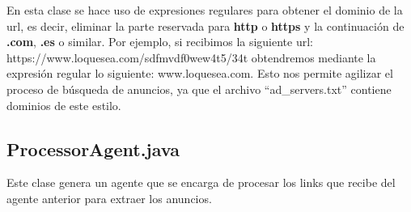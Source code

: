 \documentclass{pre-tfg}
\begin{document}
En esta clase se hace uso de expresiones regulares para obtener el dominio de la url, es decir, eliminar
la parte reservada para \textbf{http} o \textbf{https} y la continuación de \textbf{.com}, \textbf{.es} o similar. Por ejemplo, si recibimos la siguiente url:
https://www.loquesea.com/sdfmvdf0wew4t5/34t obtendremos mediante la expresión regular lo siguiente:
www.loquesea.com. Esto nos permite agilizar el proceso de búsqueda de anuncios, ya que el archivo ``ad\_servers.txt''
contiene dominios de este estilo.

\subsection{ProcessorAgent.java}

Este clase genera un agente que se encarga de procesar los links que recibe del agente anterior para extraer los anuncios.
\end{document}
